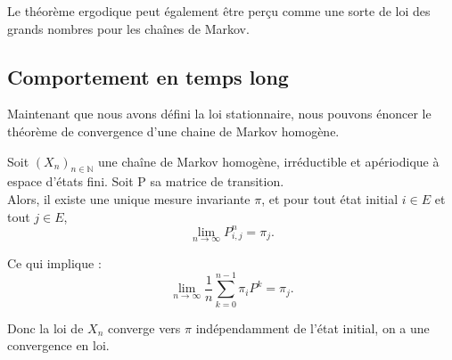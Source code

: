 \documentclass{article}
\begin{document}
Le théorème ergodique peut également être perçu comme une sorte de loi des grands nombres pour les chaînes de Markov.

\newpage %
\subsection{Comportement en temps long}

Maintenant que nous avons défini la loi stationnaire, nous pouvons énoncer le théorème de convergence d'une chaine de Markov homogène. \\ %

\begin{tcolorbox}[colback=white,colframe=red!80!black,title=Théorème de convergence]
Soit $(X_n)_{n \in \mathbb{N}}$ une chaîne de Markov homogène, irréductible et apériodique à espace d'états fini. Soit P sa matrice de transition.\\
Alors, il existe une unique mesure invariante $\pi$, et pour tout état initial $i \in E$ et tout $j \in E$,
\[
\lim_{n \to \infty} P^n_{i,j} = \pi_j.
\]

Ce qui implique :
\[
\lim_{n \to \infty} \frac{1}{n} \sum_{k=0}^{n-1} \pi_i P^k = \pi_j.
\]

Donc la loi de $X_n$ converge vers $\pi$ indépendamment de l'état initial, on a une convergence en loi.
\end{tcolorbox}
\end{document}
